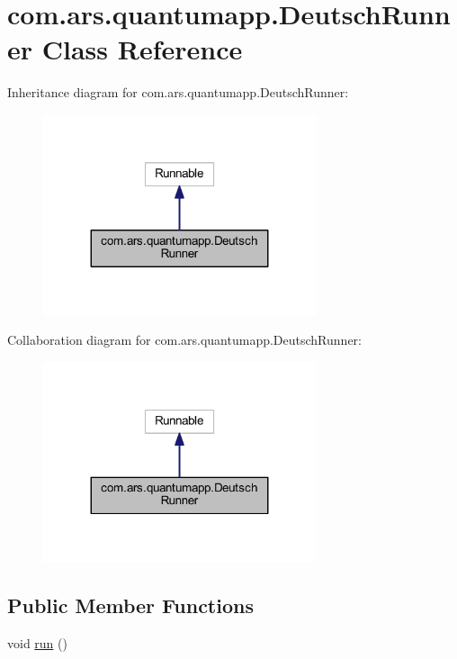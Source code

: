 \hypertarget{classcom_1_1ars_1_1quantumapp_1_1_deutsch_runner}{}\section{com.\+ars.\+quantumapp.\+Deutsch\+Runner Class Reference}
\label{classcom_1_1ars_1_1quantumapp_1_1_deutsch_runner}


Inheritance diagram for com.\+ars.\+quantumapp.\+Deutsch\+Runner\+:\nopagebreak
\begin{figure}[H]
\begin{center}
\leavevmode
\includegraphics[width=227pt]{classcom_1_1ars_1_1quantumapp_1_1_deutsch_runner__inherit__graph}
\end{center}
\end{figure}


Collaboration diagram for com.\+ars.\+quantumapp.\+Deutsch\+Runner\+:\nopagebreak
\begin{figure}[H]
\begin{center}
\leavevmode
\includegraphics[width=227pt]{classcom_1_1ars_1_1quantumapp_1_1_deutsch_runner__coll__graph}
\end{center}
\end{figure}
\subsection*{Public Member Functions}
\begin{DoxyCompactItemize}
\item 
void \hyperlink{classcom_1_1ars_1_1quantumapp_1_1_deutsch_runner_a8dbef89cef296d4bb392f303e7c7ed85}{run} ()
\end{DoxyCompactItemize}


